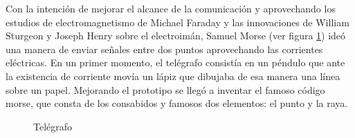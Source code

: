 Con la intención de mejorar el alcance de la comunicación y aprovechando los estudios de electromagnetismo de Michael Faraday y las innovaciones de William Sturgeon y Joseph Henry sobre el electroimán, Samuel Morse (ver figura \ref{fig:telegrafo}) ideó una manera de enviar señales entre dos puntos aprovechando las corrientes eléctricas. En un primer momento, el telégrafo consistía en un péndulo que ante la existencia de corriente movía un lápiz que dibujaba de esa manera una línea sobre un papel. Mejorando el prototipo se llegó a inventar el famoso código morse, que consta de los consabidos y famosos dos elementos: el punto y la raya.

\begin{figure}[h!btp]
	\begin{adjustbox}{minipage=\linewidth, fbox}
		\centering
		\hspace{10mm}
	\end{adjustbox}
\caption{Telégrafo}
	\label{fig:telegrafo}
\end{figure}

